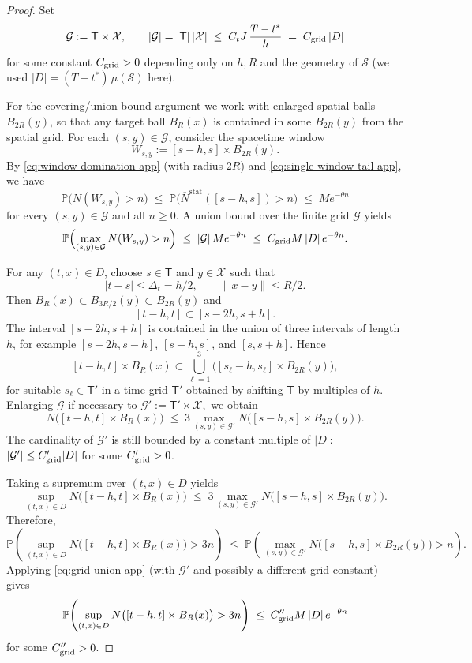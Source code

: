 \documentclass{statsoc}
\newcommand{\bbP}{\mathbb{P}}
\newcommand{\1}{\mathbbm{1}}
\begin{document}
\begin{proof}
Set
\[
  \mathcal G := \mathsf{T}\times \mathcal X,\qquad
  |\mathcal G| = |\mathsf{T}|\,|\mathcal X|
  \;\le\; C_t J\,\frac{T-t^\ast}{h}
  \;=\; C_{\rm grid}\,|D|
\]
for some constant $C_{\rm grid}>0$ depending only on $h,R$ and the geometry of $\mathcal{S}$ (we used $|D|=(T-t^\ast)\,\mu(\mathcal{S})$ here).

For the covering/union-bound argument we work with enlarged spatial balls \(B_{2R}(y)\), so that any target ball \(B_R(x)\) is contained in some \(B_{2R}(y)\) from the spatial grid. For each $(s,y)\in\mathcal G$, consider the spacetime window
\[
  W_{s,y}:=[s-h,s]\times B_{2R}(y).
\]
By \eqref{eq:window-domination-app} (with radius $2R$) and \eqref{eq:single-window-tail-app}, we have
\[
  \bbP\bigl(N(W_{s,y})>n\bigr)
  \;\le\;
  \bbP\bigl(\overline N^{\mathrm{stat}}([s-h,s])>n\bigr)
  \;\le\; M e^{-\theta n}
\]
for every $(s,y)\in\mathcal G$ and all $n\ge 0$.  A union bound over the finite grid $\mathcal G$ yields
\begin{equation}\label{eq:grid-union-app}
  \bbP\Bigl(
    \max_{(s,y)\in\mathcal G} N(W_{s,y})>n
  \Bigr)
  \;\le\; |\mathcal G|\,M e^{-\theta n}
  \;\le\; C_{\rm grid} M\,|D|\,e^{-\theta n}.
\end{equation}

For any $(t,x)\in D$, choose $s\in\mathsf{T}$ and $y\in\mathcal X$ such that
\[
  |t-s|\le \Delta_t = h/2,\qquad \|x-y\|\le R/2.
\]
Then $B_R(x)\subset B_{3R/2}(y)\subset B_{2R}(y)$ and
\[
  [t-h,t]
  \subset [s-2h,s+h].
\]
The interval $[s-2h,s+h]$ is contained in the union of three intervals of length $h$, for example $[s-2h,s-h]$, $[s-h,s]$, and $[s,s+h]$.  Hence
\[
  [t-h,t]\times B_R(x)
  \subset \bigcup_{\ell=1}^3
    \bigl([s_\ell-h,s_\ell]\times B_{2R}(y)\bigr),
\]
for suitable $s_\ell\in\mathsf{T}'$ in a time grid $\mathsf{T}'$ obtained by shifting $\mathsf{T}$ by multiples of $h$.  Enlarging $\mathcal G$ if necessary to
\(
  \mathcal G':=\mathsf{T}'\times\mathcal X,
\)
we obtain
\[
  N\bigl([t-h,t]\times B_R(x)\bigr)
  \;\le\; 3\max_{(s,y)\in\mathcal G'} N\bigl([s-h,s]\times B_{2R}(y)\bigr).
\]
The cardinality of $\mathcal G'$ is still bounded by a constant multiple of $|D|$: $|\mathcal G'|\le C'_{\rm grid}|D|$ for some $C'_{\rm grid}>0$.

Taking a supremum over $(t,x)\in D$ yields
\[
  \sup_{(t,x)\in D} N\bigl([t-h,t]\times B_R(x)\bigr)
  \;\le\; 3\max_{(s,y)\in\mathcal G'} N\bigl([s-h,s]\times B_{2R}(y)\bigr).
\]
Therefore,
\[
  \bbP\!\left(
    \sup_{(t,x)\in D} N\bigl([t-h,t]\times B_R(x)\bigr) > 3n
  \right)
  \;\le\;
  \bbP\!\left(
    \max_{(s,y)\in\mathcal G'} N\bigl([s-h,s]\times B_{2R}(y)\bigr) > n
  \right).
\]
Applying \eqref{eq:grid-union-app} (with $\mathcal G'$ and possibly a different grid constant) gives
\[
  \bbP\!\left(
    \sup_{(t,x)\in D} N\bigl([t-h,t]\times B_R(x)\bigr) > 3n
  \right)
  \;\le\; C''_{\rm grid} M\,|D|\,e^{-\theta n}
\]
for some $C''_{\rm grid}>0$.


\end{proof}
\end{document}
